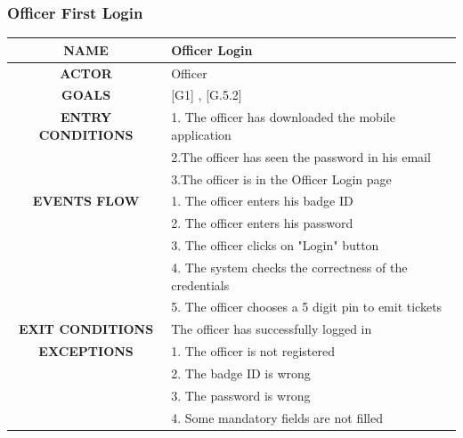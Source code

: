\documentclass[12pt,a4paper]{article}
\begin{document}
\subsubsection{Officer First Login}
		\begin{center}
			\begin{tabular}{| c | l |}
				\hline
				\textbf{NAME} & Officer Login \\
				\hline
				\textbf{ACTOR} & Officer \\
				\hline
				\textbf{GOALS} & [G1] , [G.5.2] \\
				\hline
				\textbf{ENTRY CONDITIONS} &1. The officer has downloaded the mobile application \\
				&2.The officer has seen the password in his email\\
				&3.The officer is in the Officer Login page \\ \hline
				\textbf{EVENTS FLOW}  &
				1. The officer enters his badge ID\\
				&2. The officer enters his password\\
				&3. The officer clicks on "Login" button\\
				&4. The system checks the correctness of the credentials\\
				&5. The officer chooses a 5 digit pin to emit tickets \\ \hline
				\textbf{EXIT CONDITIONS}  & The officer has successfully logged in \\ \hline
				\textbf{EXCEPTIONS} &
				1. The officer is not registered\\
				&2. The badge ID is wrong\\
				&3. The password is wrong\\
				&4. Some mandatory fields are not filled\\
				\hline
			\end{tabular}
		\end{center}
\newpage
\end{document}
